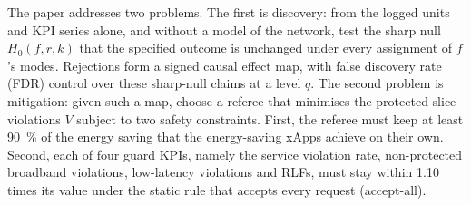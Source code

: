 The paper addresses two problems. The first is discovery: from the logged units and KPI series alone, and without a
model of the network, test the sharp null $H_0(f, r, k)$ that the specified outcome is unchanged under every assignment
of $f$'s modes. Rejections form a signed causal effect map, with false discovery rate (FDR) control over these
sharp-null claims at a level $q$. The second
problem is mitigation: given such a map, choose a referee that minimises the protected-slice violations $V$ subject to
two safety constraints. First, the referee must keep at least 90~\% of the energy saving that the energy-saving xApps
achieve on their own. Second, each of four guard KPIs, namely the service violation rate, non-protected broadband
violations, low-latency violations and RLFs, must stay within 1.10 times its value under the static rule that accepts
every request (accept-all).
